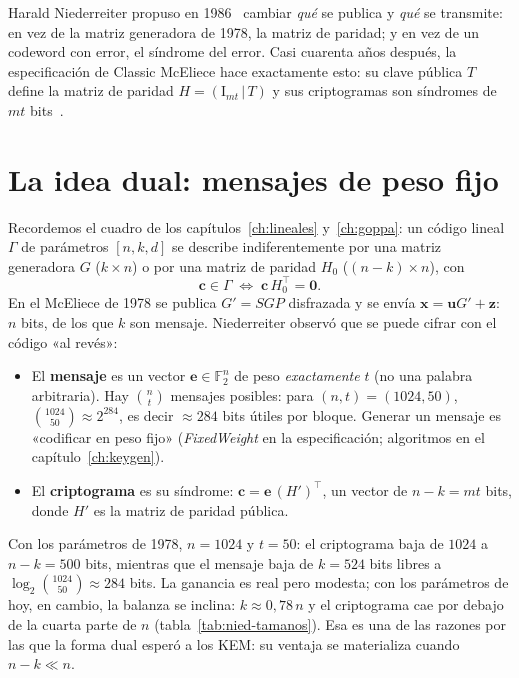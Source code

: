 \documentclass[11pt,a4paper,oneside]{report}
\newcommand{\F}{\mathbb{F}}
\newcommand{\ve}{\mathbf{e}}
\newcommand{\vx}{\mathbf{x}}
\newcommand{\vc}{\mathbf{c}}
\newcommand{\vu}{\mathbf{u}}
\newcommand{\vz}{\mathbf{z}}
\newcommand{\Ftwo}{\F_2}
\begin{document}
\begin{historia}
Harald Niederreiter propuso en 1986~\cite{niederreiter1986} cambiar
\emph{qué} se publica y \emph{qué} se transmite: en vez de la matriz
generadora de 1978, la matriz de paridad; y en vez de un codeword con
error, el síndrome del error. Casi cuarenta años después, la
especificación de Classic McEliece hace exactamente esto: su clave
pública $T$ define la matriz de paridad $H=(\mathrm{I}_{mt}\,|\,T)$ y
sus criptogramas son síndromes de $mt$ bits~\cite{cmspec}.
\end{historia}

\section{La idea dual: mensajes de peso fijo}

Recordemos el cuadro de los capítulos~\ref{ch:lineales}
y~\ref{ch:goppa}: un código lineal $\Gamma$ de parámetros $[n,k,d]$ se
describe indiferentemente por una matriz generadora $G$ ($k\times n$)
o por una matriz de paridad $H_0$ ($(n-k)\times n$), con
\[
\vc\in\Gamma \;\Longleftrightarrow\;
\vc\,H_0^{\top}=\mathbf{0} .
\]
En el McEliece de 1978 se publica $G'=SGP$ disfrazada y se envía
$\vx=\vu G'+\vz$: $n$ bits, de los que $k$ son mensaje. Niederreiter
observó que se puede cifrar con el código «al revés»:

\begin{itemize}[leftmargin=1.4em,itemsep=3pt]
  \item El \textbf{mensaje} es un vector $\ve\in\Ftwo^n$ de peso
        \emph{exactamente} $t$ (no una palabra arbitraria). Hay
        $\binom{n}{t}$ mensajes posibles: para $(n,t)=(1024,50)$,
        $\binom{1024}{50}\approx2^{284}$, es decir $\approx284$ bits
        útiles por bloque. Generar un mensaje es «codificar en peso
        fijo» (\emph{FixedWeight} en la especificación; algoritmos en
        el capítulo~\ref{ch:keygen}).
  \item El \textbf{criptograma} es su síndrome:
        $\vc=\ve\,(H')^{\top}$, un vector de $n-k=mt$ bits,
        donde $H'$ es la matriz de paridad pública.
\end{itemize}

Con los parámetros de 1978, $n=1024$ y $t=50$: el criptograma baja de
$1024$ a $n-k=500$ bits, mientras que el mensaje baja de $k=524$ bits
libres a $\log_2\binom{1024}{50}\approx284$ bits. La ganancia es real
pero modesta; con los parámetros de hoy, en cambio, la balanza se
inclina: $k\approx0{,}78\,n$ y el criptograma cae por debajo de la
cuarta parte de $n$ (tabla~\ref{tab:nied-tamanos}). Esa es una de las
razones por las que la forma dual esperó a los KEM: su ventaja se
materializa cuando $n-k\ll n$.
\end{document}
